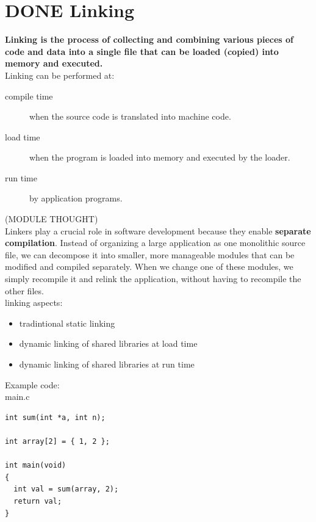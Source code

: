 \documentclass[11pt]{article}
\begin{document}
\section{{\bfseries\sffamily DONE} Linking}
\label{sec:orgea647c7}

\textbf{Linking is the process of collecting and combining various pieces of code and data into a single file that can be loaded (copied) into memory and executed.}\\

Linking can be performed at:\\
\begin{description}
\item[{compile time}] when the source code is translated into machine code.\\
\item[{load time}] when the program is loaded into memory and executed by the loader.\\
\item[{run time}] by application programs.\\
\end{description}

(MODULE THOUGHT)\\
Linkers play a crucial role in software development because they enable \textbf{separate compilation}. Instead of organizing a large application as one monolithic source file, we can decompose it into smaller, more manageable modules that can be modified and compiled separately. When we change one of these modules, we simply recompile it and relink the application, without having to recompile the other files.\\

linking aspects:\\
\begin{itemize}
\item tradintional static linking\\
\item dynamic linking of shared libraries at load time\\
\item dynamic linking of shared libraries at run time\\
\end{itemize}

Example code:\\
main.c\\
\begin{verbatim}
int sum(int *a, int n);

int array[2] = { 1, 2 };

int main(void)
{
  int val = sum(array, 2);
  return val;
}

\end{verbatim}
\end{document}
